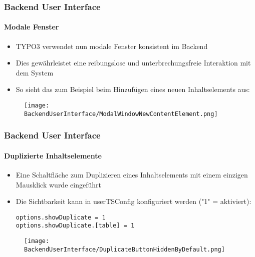 \begin{frame}[fragile]
	\frametitle{Backend User Interface}
	\framesubtitle{Modale Fenster}

	\begin{itemize}
		\item TYPO3 verwendet nun modale Fenster konsistent im Backend
		\item Dies gewährleistet eine reibungslose und unterbrechungsfreie Interaktion mit dem System
		\item So sieht das zum Beispiel beim Hinzufügen eines neuen Inhaltselements aus:
	\end{itemize}

	\begin{figure}
		\texttt{[image: BackendUserInterface/ModalWindowNewContentElement.png]}
	\end{figure}

\end{frame}


\begin{frame}[fragile]
	\frametitle{Backend User Interface}
	\framesubtitle{Duplizierte Inhaltselemente}

	\lstset{basicstyle=\smaller\ttfamily}

	\begin{itemize}
		\item Eine Schaltfläche zum Duplizieren eines Inhaltselements mit einem einzigen Mausklick wurde eingeführt
		\item Die Sichtbarkeit kann in userTSConfig konfiguriert werden ("1" = aktiviert):

\begin{lstlisting}
options.showDuplicate = 1
options.showDuplicate.[table] = 1
\end{lstlisting}

	\end{itemize}
	\vspace{-0.5cm}
	\begin{figure}
		\texttt{[image: BackendUserInterface/DuplicateButtonHiddenByDefault.png]}
	\end{figure}

\end{frame}



